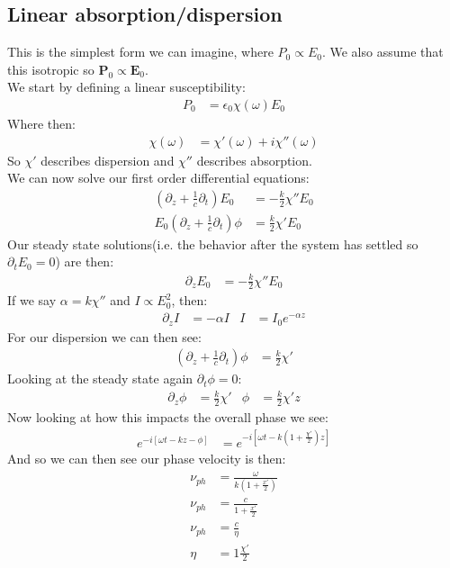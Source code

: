 \subsection{Linear absorption/dispersion}
This is the simplest form we can imagine, where $P_0 \propto E_0$. We also assume that this isotropic so $\bm{P}_0\propto\bm{E}_0$. \\
We start by defining a linear susceptibility:
\begin{align*}
	P_0 &= \epsilon_0\chi(\omega)E_0
\end{align*}
Where then:
\begin{align*}
	\chi(\omega) &= \chi'(\omega) + i\chi''(\omega)
\end{align*}
So $\chi'$ describes dispersion and $\chi''$ describes absorption. \\
We can now solve our first order differential equations:
\begin{align*}
	\left(\partial_z + \frac{1}{c}\partial_t\right)E_0 &= -\frac{k}{2} \chi'' E_0 \\
	E_0\left(\partial_z + \frac{1}{c}\partial_t\right)\phi &= \frac{k}{2} \chi' E_0
\end{align*}
Our steady state solutions(i.e. the behavior after the system has settled so $\partial_t E_0 =0$) are then:
\begin{align*}
	\partial_z E_0 &= -\frac{k}{2}\chi''E_0
\end{align*}
If we say $\alpha = k\chi''$ and $I \propto E_0^2$, then:
\begin{align*}
	\partial_z I &= -\alpha I &
	I &= I_0 e^{-\alpha z}
\end{align*}
For our dispersion we can then see:
\begin{align*}
	\left(\partial_z + \frac{1}{c}\partial_t\right)\phi &= \frac{k}{2} \chi'
\end{align*}
Looking at the steady state again $\partial_t\phi =0$:
\begin{align*}
	\partial_z\phi &= \frac{k}{2} \chi' &
	\phi &= \frac{k}{2} \chi'z 
\end{align*}
Now looking at how this impacts the overall phase we see:
\begin{align*}
	e^{-i[\omega t- kz -\phi]} &= e^{-i\left[\omega t -k\left(1+\frac{\chi'}{2}\right)z\right]}
\end{align*}
And so we can then see our phase velocity is then:
\begin{align*}
	\nu_{ph} &= \frac{\omega}{k\left(1+\frac{x'}{2}\right)} \\
	\nu_{ph} &= \frac{c}{1+\frac{x'}{2}} \\
	\nu_{ph} &= \frac{c}{\eta} \\
	\eta &= 1 \frac{\chi'}{2}
\end{align*}
